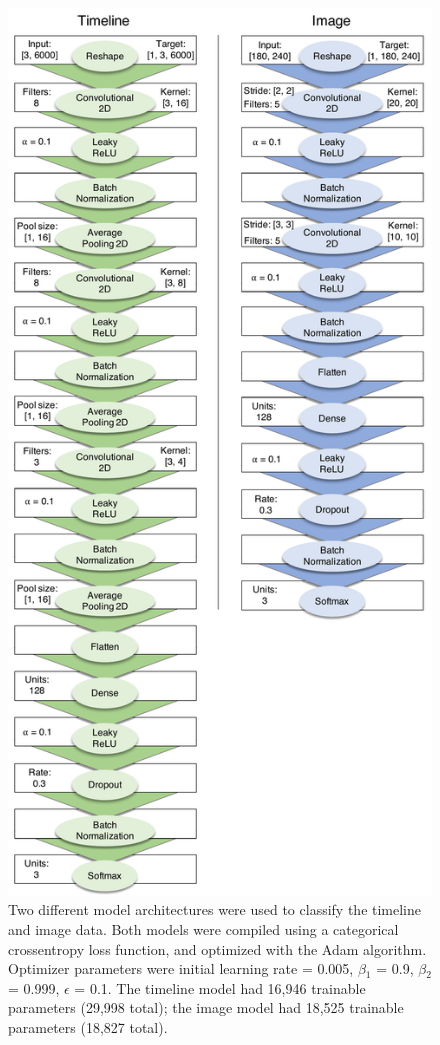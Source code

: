 \documentclass[
  english,
  man, donotrepeattitle,floatsintext]{apa6}
\begin{document}
\begin{figure}
\centering
\includegraphics{figures/models.pdf}
\caption{\label{fig:models}Two different model architectures were used to classify the timeline and image data. Both models were compiled using a categorical crossentropy loss function, and optimized with the Adam algorithm. Optimizer parameters were initial learning rate = 0.005, \(\beta\)\(_1\) = 0.9, \(\beta\)\(_2\) = 0.999, \(\epsilon\) = 0.1. The timeline model had 16,946 trainable parameters (29,998 total); the image model had 18,525 trainable parameters (18,827 total).}
\end{figure}
\end{document}
